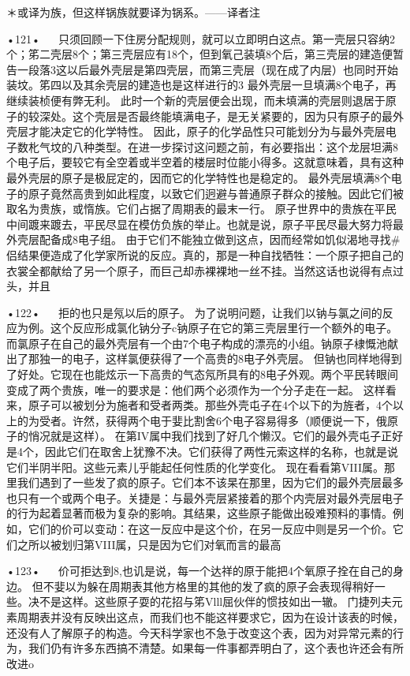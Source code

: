 ＊或译为族，但这样锅族就要译为锅系。—---译者注

•121•
  
只须回顾一下住房分配规则，就可以立即明白这点。第一壳层只容纳2个；笫二壳层8个；第三壳层应有18个，但到氧己装填8个后，第三壳层的建造便暂告一段落3这以后最外壳层是第四壳层，而第三壳层（现在成了内层）也同时开始装坟。笫四以及其余壳层的建造也是这样进行的3
最外壳层一旦填满8个电子，再继续装桢便有弊无利。
此时一个新的壳层便会出现，而未填满的壳层则退居于原子的较深处。这个壳层是否最终能填满电子，是无关紧要的，因为只有原子的最外壳层才能决定它的化学特性。
因此，原子的化学品性只可能划分为与最外壳层电子数朼气坟的八种类型。在进一步探讨这问题之前，有必要指出：这个龙层坦满8个电子后，要较它有全空着或半空着的楼层时位能小得多。这就意味着，具有这种最外壳层的原子是极屁定的，因而它的化学特性也是稳定的。
最外壳层填满8个电子的原子竟然高贵到如此程度，以致它们迥避与普通原子群众的接触。因此它们被取名为贵族，或惰族。它们占据了周期表的最末一行。
原子世界中的贵族在平民中间踱来踱去，平民尽显在模仿负族的举止。也就是说，原子平民尽最大努力将最外壳层配备成8电子组。
由于它们不能独立做到这点，因而经常如饥似渴地寻找#侣结果便造成了化学家所说的反应。真的，那是一种自找牺牲：一个原子把自己的衣裳全都献给了另一个原子，而巨己却赤裸裸地一丝不挂。当然这话也说得有点过头，并且

•122•
  
拒的也只是氖以后的原子。
为了说明问题，让我们以钠与氯之间的反应为例。这个反应形成氯化钠分子c钠原子在它的第三壳层里行一个额外的电子。而氯原子在自己的最外壳层有一个由7个电子构成的漂亮的小组。钠原子棣慨池献出了那独一的电子，这样氯便获得了一个高贵的8电子外壳层。
但钠也同样地得到了好处。它现在也能炫示一下高贵的气态氖所具有的8电子外观。两个平民转眼间变成了两个贵族，唯一的要求是：他们两个必须作为一个分子走在一起。
这样看来，原子可以被划分为施者和受者两类。那些外壳屯子在4个以下的为旌者，4个以上的为受者。许然，获得两个电于婓比割舍6个电子容易得多（顺便说一下，俄原子的悄况就是这样）。
在第IV属中我们找到了好几个懒汉。它们的最外壳屯子正好是4个，因此它们在取舍上犹豫不决。它们获得了两性元索这样的名称，也就是说它们半阴半阳。这些元素儿乎能起任何性质的化学变化。
现在看看第VIII属。那里我们遇到了一些发了疯的原子。它们本不该杲在那里，因为它们的最外壳层最多也只有一个或两个电子。关捷是：与最外壳层紧接着的那个内壳层对最外壳层电子的行为起着显著而极为复杂的影响。其结果，这些原子能做出砓难预料的事情。例如，它们的价可以变动：在这一反应中是这个价，在另一反应中则是另一个价。它们之所以被划归第VIII属，只是因为它们对氧而言的最高

•123•
  
价可拒达到8,也讥是说，每一个达祥的原于能把4个氧原子拴在自己的身边。
但不婓以为躲在周期表其他方格里的其他的发了疯的原子会表现得稍好一些。决不是这样。这些原子耍的花招与笫Vlll屈伙伴的惯技如出一辙。
门捷列夫元素周期表并没有反映出这点，而我们也不能这祥要求它，因为在设计该表的时候，还没有人了解原子的构造。今天科学家也不急于改变这个表，因为对异常元素的行为，我们仍有许多东西搞不清楚。如果每一件事都弄明白了，这个表也许还会有所改进o

